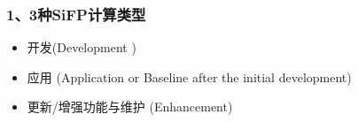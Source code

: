 \hypertarget{ux4e09ux79cdsifpux8ba1ux7b97ux7c7bux578b}{%
\subsubsection{1、3种SiFP计算类型}\label{ux4e09ux79cdsifpux8ba1ux7b97ux7c7bux578b}}

\begin{itemize}
\tightlist
\item
  开发(Development )
\end{itemize}

\begin{description}
\item[]
\end{description}

\begin{itemize}
\tightlist
\item
  应用 (Application or Baseline after the initial development)
\end{itemize}

\begin{description}
\item[]
\end{description}

\begin{itemize}
\tightlist
\item
  更新/增强功能与维护 (Enhancement)
\end{itemize}

\begin{description}
\item[]
\end{description}


